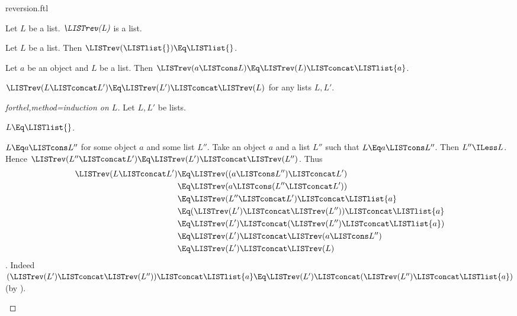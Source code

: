 \documentclass{stex}
\begin{document}
\begin{smodule}{reversion.ftl}

\begin{signature}[forthel,for=LISTrev]
  Let $L$ be a list.
  $\emph{\LISTrev(L)}$ is a list.
\end{signature}

\begin{axiom}[forthel,for=LISTrev]
  Let $L$ be a list.
  Then $\LISTrev(\LISTlist{}) \Eq \LISTlist{}$.
\end{axiom}

\begin{axiom}[forthel,for=LISTrev]
  Let $a$ be an object and $L$ be a list.
  Then $\LISTrev(a \LISTcons L) \Eq \LISTrev(L) \LISTconcat \LISTlist{a}$.
\end{axiom}

\begin{proposition}[forthel]
  $\LISTrev(L \LISTconcat L') \Eq \LISTrev(L') \LISTconcat \LISTrev(L)$ for any lists $L, L'$.
\end{proposition}
\begin{proof}[forthel,method=induction on $L$]
  Let $L,L'$ be lists.

  \begin{case}{$L \Eq \LISTlist{}$.} \end{case}

  \begin{case}{$L \Eq a \LISTcons L''$ for some object $a$ and some list $L''$.}
    Take an object $a$ and a list $L''$ such that $L \Eq a \LISTcons L''$.
    Then $L'' \ILess L$.
    Hence $\LISTrev(L'' \LISTconcat L') \Eq \LISTrev(L') \LISTconcat \LISTrev(L'')$.
    Thus
    \begin{align*}
      \LISTrev(L \LISTconcat L')
        &\Eq \LISTrev((a \LISTcons L'') \LISTconcat L')\\
        &\Eq \LISTrev(a \LISTcons (L'' \LISTconcat L'))\\
        &\Eq \LISTrev(L'' \LISTconcat L') \LISTconcat \LISTlist{a}\\
        &\Eq (\LISTrev(L') \LISTconcat \LISTrev(L'')) \LISTconcat \LISTlist{a}\\
        &\Eq \LISTrev(L') \LISTconcat (\LISTrev(L'') \LISTconcat \LISTlist{a})\\
        &\Eq \LISTrev(L') \LISTconcat \LISTrev(a \LISTcons L'')\\
        &\Eq \LISTrev(L') \LISTconcat \LISTrev(L)
    \end{align*}.
    Indeed $(\LISTrev(L') \LISTconcat \LISTrev(L'')) \LISTconcat \LISTlist{a} \Eq \LISTrev(L') \LISTconcat (\LISTrev(L'') \LISTconcat \LISTlist{a})$ (by ).
  \end{case}
\end{proof}


\end{smodule}
\end{document}
